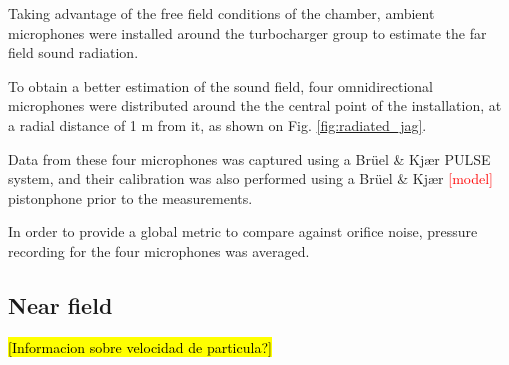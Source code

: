 Taking advantage of the free field conditions of the chamber, ambient microphones were installed around the turbocharger group to estimate the far field sound radiation.

To obtain a better estimation of the sound field, four omnidirectional microphones were distributed around the the central point of the installation, at a radial distance of 1 m from it, as shown on Fig. \ref{fig:radiated_jag}.

Data from these four microphones was captured using a Brüel \& Kjær PULSE system, and their calibration was also performed using a Brüel \& Kjær \textcolor{red}{[model]} pistonphone prior to the measurements.

In order to provide a global metric to compare against orifice noise, pressure recording for the four microphones was averaged.


\subsection{Near field}

\hl{[Informacion sobre velocidad de particula?]}